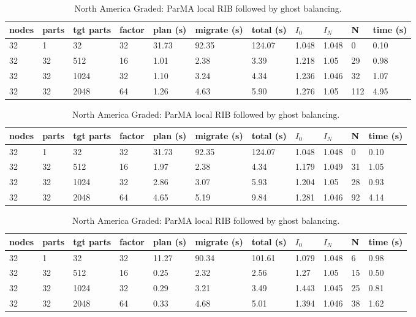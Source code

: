 \documentclass[a4paper]{article}
\begin{document}
\begin{table}
\centering
\caption{\label{tab:nalg}North America Graded: Zoltan Local ParMETIS followed by ghost balancing.}
\begin{tabular}{  l | l | l | l | l | l | l | l | l | l | l }
    \hline
    nodes & parts & tgt parts & factor & plan (s) & migrate (s) & total (s) & $I_0$ & $I_N$ & N & time (s) \\ \hline
    32 & 1 & 32 & 32 & 31.73 & 92.35 & 124.07 & 1.048 & 1.048 & 0 & 0.10 \\ 
    32 & 32 & 512 & 16 & 1.01 & 2.38 & 3.39 & 1.218 & 1.05 & 29 & 0.98 \\ 
    32 & 32 & 1024 & 32 & 1.10 & 3.24 & 4.34 & 1.236 & 1.046 & 32 & 1.07 \\ 
    32 & 32 & 2048 & 64 & 1.26 & 4.63 & 5.90 & 1.276 & 1.05 & 112 & 4.95 \\ 
\end{tabular}

\caption{\label{tab:nagg}North America Graded: Zoltan Global ParMETIS followed by ghost balancing.}
\begin{tabular}{  l | l | l | l | l | l | l | l | l | l | l }
    \hline
    nodes & parts & tgt parts & factor & plan (s) & migrate (s) & total (s) & $I_0$ & $I_N$ & N & time (s) \\ \hline
    32 & 1 & 32 & 32 & 31.73 & 92.35 & 124.07 & 1.048 & 1.048 & 0 & 0.10 \\ 
    32 & 32 & 512 & 16 & 1.97 & 2.38 & 4.34 & 1.179 & 1.049 & 31 & 1.05 \\ 
    32 & 32 & 1024 & 32 & 2.86 & 3.07 & 5.93 & 1.204 & 1.05 & 28 & 0.93 \\ 
    32 & 32 & 2048 & 64 & 4.65 & 5.19 & 9.84 & 1.281 & 1.046 & 92 & 4.14 \\ 
\end{tabular}

\caption{\label{tab:naplrib}North America Graded: ParMA local RIB followed by ghost balancing.}
\begin{tabular}{  l | l | l | l | l | l | l | l | l | l | l }
    \hline
    nodes & parts & tgt parts & factor & plan (s) & migrate (s) & total (s) & $I_0$ & $I_N$ & N & time (s) \\ \hline
    32 & 1 & 32 & 32 & 11.27 & 90.34 & 101.61 & 1.079 & 1.048 & 6 & 0.98 \\ 
    32 & 32 & 512 & 16 & 0.25 & 2.32 & 2.56 & 1.27 & 1.05 & 15 & 0.50 \\ 
    32 & 32 & 1024 & 32 & 0.29 & 3.21 & 3.49 & 1.443 & 1.045 & 25 & 0.81 \\ 
    32 & 32 & 2048 & 64 & 0.33 & 4.68 & 5.01 & 1.394 & 1.046 & 38 & 1.62 \\ 
\end{tabular}


\end{table}
\end{document}
